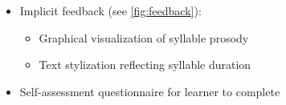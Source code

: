 \documentclass[a0,portrait]{a0poster}
\newcommand{\headingcolor}{\color{BannerSixColor}}
\def\Highlight#1{{\sffamily \headingcolor #1}}
\begin{document}
\begin{textblock}{7}
\begin{textblock}{7}
  \begin{itemize}
  \item{\Highlight{Implicit feedback} (see \cref{fig:feedback}):
	  	\begin{itemize}
	  	\item{Graphical visualization of syllable prosody}
	  	\item{Text stylization reflecting syllable duration}
	  	\end{itemize}
	}
  \item{\Highlight{Self-assessment} questionnaire for learner to complete %
  }
  \end{itemize}




\end{textblock}
  
  \end{textblock}
  
  
  
\end{document}
